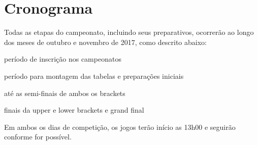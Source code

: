 \section{Cronograma}

Todas as etapas do campeonato, incluindo seus preparativos, ocorrerão ao longo dos meses de outubro e novembro de 2017, como descrito abaixo:

\begin{description}[leftmargin=!,labelwidth=\widthof{\bfseries até 10/11},labelindent=1.5em]
	\item[até 10/11] período de inscrição nos campeonatos
	\item[10/11] período para montagem das tabelas e preparações iniciais
	\item[11/11] até as semi-finais de ambos os brackets
	\item[12/11] finais da upper e lower brackets e grand final
\end{description}

Em ambos os dias de competição, os jogos terão início as 13h00 e seguirão conforme for possível.
